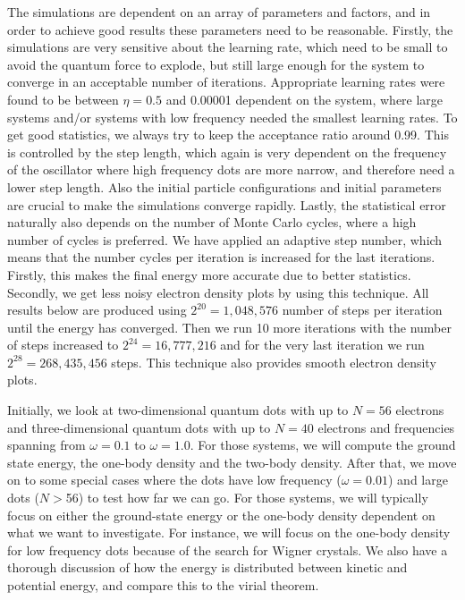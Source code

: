 The simulations are dependent on an array of parameters and factors, and in order to achieve good results these parameters need to be reasonable. Firstly, the simulations are very sensitive about the learning rate, which need to be small to avoid the quantum force to explode, but still large enough for the system to converge in an acceptable number of iterations. Appropriate learning rates were found to be between $\eta=0.5$ and 0.00001 dependent on the system, where large systems and/or systems with low frequency needed the smallest learning rates. To get good statistics, we always try to keep the acceptance ratio around 0.99. This is controlled by the step length, which again is very dependent on the frequency of the oscillator where high frequency dots are more narrow, and therefore need a lower step length. Also the initial particle configurations and initial parameters are crucial to make the simulations converge rapidly. Lastly, the statistical error naturally also depends on the number of Monte Carlo cycles, where a high number of cycles is preferred. We have applied an adaptive step number, which means that the number cycles per iteration is increased for the last iterations. Firstly, this makes the final energy more accurate due to better statistics. Secondly, we get less noisy electron density plots by using this technique. All results below are produced using $2^{20}=1,048,576$ number of steps per iteration until the energy has converged. Then we run 10 more iterations with the number of steps increased to $2^{24}=16,777,216$ and for the very last iteration we run $2^{28}=268,435,456$ steps. This technique also provides smooth electron density plots.

Initially, we look at two-dimensional quantum dots with up to $N=56$ electrons and three-dimensional quantum dots with up to $N=40$ electrons and frequencies spanning from  $\omega=0.1$ to $\omega=1.0$. For those systems, we will compute the ground state energy, the one-body density and the two-body density. After that, we move on to some special cases where the dots have low frequency ($\omega=0.01$) and large dots ($N>$56) to test how far we can go. For those systems, we will typically focus on either the ground-state energy or the one-body density dependent on what we want to investigate. For instance, we will focus on the one-body density for low frequency dots because of the search for Wigner crystals. We also have a thorough discussion of how the energy is distributed between kinetic and potential energy, and compare this to the virial theorem.

